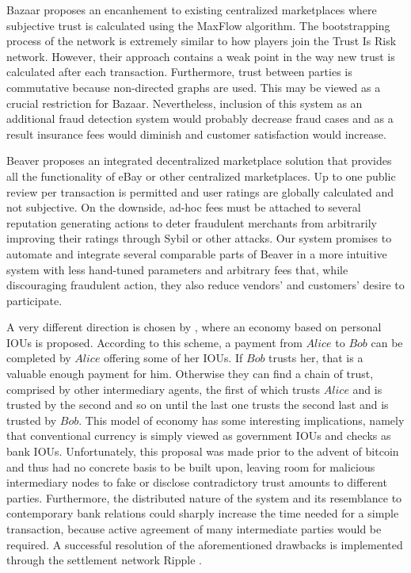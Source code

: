   Bazaar \cite{bazaar} proposes an encanhement to existing centralized marketplaces where subjective trust is calculated
  using the MaxFlow algorithm. The bootstrapping process of the network is extremely similar to how players join the Trust Is
  Risk network. However, their approach contains a weak point in the way new trust is calculated after each transaction.
  Furthermore, trust between parties is commutative because non-directed graphs are used. This may be viewed as a crucial
  restriction for Bazaar.  Nevertheless, inclusion of this system as an additional fraud detection system would probably
  decrease fraud cases and as a result insurance fees would diminish and customer satisfaction would increase.

  Beaver \cite{beaver} proposes an integrated decentralized marketplace solution that provides all the functionality of eBay
  or other centralized marketplaces. Up to one public review per transaction is permitted and user ratings are globally
  calculated and not subjective. On the downside, ad-hoc fees must be attached to several reputation generating actions to
  deter fraudulent merchants from arbitrarily improving their ratings through Sybil or other attacks. Our system promises to
  automate and integrate several comparable parts of Beaver in a more intuitive system with less hand-tuned parameters and
  arbitrary fees that, while discouraging fraudulent action, they also reduce vendors' and customers' desire to participate.

  A very different direction is chosen by \cite{iou}, where an economy based on personal IOUs is proposed. According to this
  scheme, a payment from $Alice$ to $Bob$ can be completed by $Alice$ offering some of her IOUs. If $Bob$ trusts her, that is
  a valuable enough payment for him. Otherwise they can find a chain of trust, comprised by other intermediary agents, the
  first of which trusts $Alice$ and is trusted by the second and so on until the last one trusts the second last and is
  trusted by $Bob$. This model of economy has some interesting implications, namely that conventional currency is simply
  viewed as government IOUs and checks as bank IOUs. Unfortunately, this proposal was made prior to the advent of bitcoin
  and thus had no concrete basis to be built upon, leaving room for malicious intermediary nodes to fake or disclose
  contradictory trust amounts to different parties. Furthermore, the distributed nature of the system and its resemblance to
  contemporary bank relations could sharply increase the time needed for a simple transaction, because active agreement of
  many intermediate parties would be required. A successful resolution of the aforementioned drawbacks is implemented through
  the settlement network Ripple \cite{ripple}.

